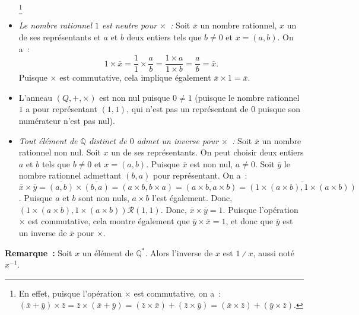 \begin{itemize}[nosep]
            \footnote{En effet, puisque l'opération $\times$ est commutative, on a : $(\bar{x} + \bar{y}) \times \bar{z} = \bar{z} \times (\bar{x} + \bar{y}) = (\bar{z} \times \bar{x}) + (\bar{z} \times \bar{y}) = (\bar{x} \times \bar{z}) + (\bar{y} \times \bar{z})$.}
    \item \emph{Le nombre rationnel $1$ est neutre pour $\times$ :} 
        Soit $\bar{x}$ un nombre rationnel, $x$ un de ses représentants et $a$ et $b$ deux entiers tels que $b \neq 0$ et $x = (a, b)$. 
        On a : 
        \begin{equation*}
            1 \times \bar{x} = \frac{1}{1} \times \frac{a}{b}
                = \frac{1 \times a}{1 \times b}
                = \frac{a}{b}
                = \bar{x}.
        \end{equation*}
        Puisque $\times$ est commutative, cela implique également $\bar{x} \times 1 = \bar{x}$.
    \item L'anneau $(Q, +, \times)$ est non nul puisque $0 \neq 1$ (puisque le nombre rationnel $1$ a pour représentant $(1,1)$, qui n'est pas un représentant de $0$ puisque son numérateur n'est pas nul).
    \item \emph{Tout élément de $\mathbb{Q}$ distinct de $0$ admet un inverse pour $\times$ :} 
        Soit $\bar{x}$ un nombre rationnel non nul. 
        Soit $x$ un de ses représentants. 
        On peut choisir deux entiers $a$ et $b$ tels que $b \neq 0$ et $x = (a, b)$.
        Puisque $\bar{x}$ est non nul, $a \neq 0$. 
        Soit $\bar{y}$ le nombre rationnel admettant $(b, a)$ pour représentant.
        On a : $\bar{x} \times \bar{y} = \overline{(a, b)} \times \overline{(b, a)} = \overline{(a \times b, b \times a)} = \overline{(a \times b, a \times b)} = \overline{(1 \times (a \times b), 1 \times (a \times b))}$.
        Puisque $a$ et $b$ sont non nuls, $a \times b$ l'est également.
        Donc, $(1 \times (a \times b), 1 \times (a \times b)) \mathrel{\mathcal{R}} (1, 1)$.
        Donc, $\bar{x} \times \bar{y} = 1$.
        Puisque l'opération $\times$ est commutative, cela montre également que $\bar{y} \times \bar{x} = 1$, et donc que $\bar{y}$ est un inverse de $\bar{x}$ pour $\times$.
\end{itemize}

\medskip

\noindent\textbf{Remarque :} Soit $x$ un élément de $\mathbb{Q}^*$. 
    Alors l'inverse de $x$ est $1 \divslash x$, aussi noté $x^{-1}$. 

\done

\medskip

